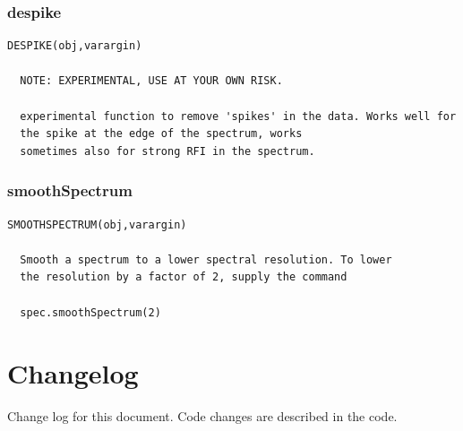 \documentclass[11pt,a4paper]{article}
\begin{document}
\subsubsection*{despike}
\label{sec:despike-1}

\begin{lstlisting}[framerule=0pt]
  DESPIKE(obj,varargin)
          
  NOTE: EXPERIMENTAL, USE AT YOUR OWN RISK.
  
  experimental function to remove 'spikes' in the data. Works well for
  the spike at the edge of the spectrum, works
  sometimes also for strong RFI in the spectrum.
\end{lstlisting}

\subsubsection*{smoothSpectrum}
\label{sec:smoothspectrum}

\begin{lstlisting}[framerule=0pt]
  SMOOTHSPECTRUM(obj,varargin)
  
  Smooth a spectrum to a lower spectral resolution. To lower
  the resolution by a factor of 2, supply the command
  
  spec.smoothSpectrum(2)
\end{lstlisting}


\section{Changelog}
\label{sec:changes}
Change log for this document. Code changes are described in the code.
\end{document}

